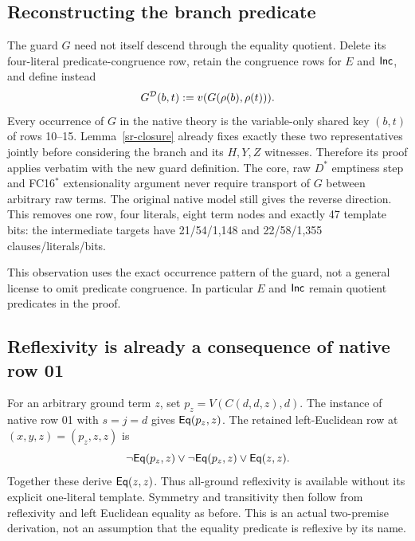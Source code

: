\subsection{Reconstructing the branch predicate}

The guard $G$ need not itself descend through the equality quotient.
Delete its four-literal predicate-congruence row, retain the congruence
rows for $E$ and $\mathsf{Inc}$, and define instead
\[
G^{\mathcal D}(b,t):=v(G(\rho(b),\rho(t))).
\]
Every occurrence of $G$ in the native theory is the variable-only shared
key $(b,t)$ of rows 10--15. Lemma~\ref{sr-closure} already fixes exactly
these two representatives jointly before considering the branch and its
$H,Y,Z$ witnesses. Therefore its proof applies verbatim with the new
guard definition. The core, raw $D^*$ emptiness step and FC16$^*$
extensionality argument never require transport of $G$ between arbitrary
raw terms. The original native model still gives the reverse direction.
This removes one row, four literals, eight term nodes and exactly 47
template bits: the intermediate targets have 21/54/1,148 and
22/58/1,355 clauses/literals/bits.

This observation uses the exact occurrence pattern of the guard, not a
general license to omit predicate congruence. In particular $E$ and
$\mathsf{Inc}$ remain quotient predicates in the proof.

\subsection{Reflexivity is already a consequence of native row 01}

For an arbitrary ground term $z$, set $p_z=V(C(d,d,z),d)$. The instance
of native row 01 with $s=j=d$ gives $\mathsf{Eq}(p_z,z)$. The retained
left-Euclidean row at $(x,y,z)=(p_z,z,z)$ is
\[
\neg\mathsf{Eq}(p_z,z)\lor\neg\mathsf{Eq}(p_z,z)\lor\mathsf{Eq}(z,z).
\]
Together these derive $\mathsf{Eq}(z,z)$. Thus all-ground reflexivity is
available without its explicit one-literal template. Symmetry and
transitivity then follow from reflexivity and left Euclidean equality
as before. This is an actual two-premise derivation, not an assumption
that the equality predicate is reflexive by its name.

